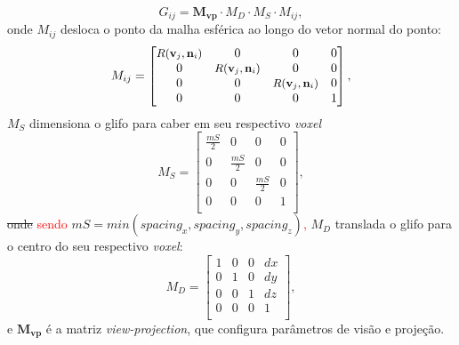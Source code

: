 \begin{equation}
    G_{ij} = \mathbf{M_{vp}}\cdot M_D \cdot M_S \cdot M_{ij},
\end{equation}
onde $M_{ij}$ desloca o ponto da malha esférica ao longo do vetor normal do ponto: 
\begin{equation}
\label{eq::dodf}
    M_{ij} = \begin{bmatrix} 
   \mbox{\small $R( \mathbf{v}_j, \mathbf{n}_i)$} & 0 & 0 & 0 \\
    0 & \mbox{\small $R( \mathbf{v}_j, \mathbf{n}_i)$}  & 0 & 0 \\
    0 & 0 & \mbox{\small $R( \mathbf{v}_j, \mathbf{n}_i)$}  & 0 \\
    0 & 0 & 0 & 1 \\
\end{bmatrix},
\end{equation}
$M_{S}$ dimensiona o glifo para caber em seu respectivo \textit{voxel}
\begin{equation}
    M_{S} = \begin{bmatrix} 
    \frac{mS}{2} & 0             & 0            & 0 \\
    0            & \frac{mS}{2} & 0            & 0 \\
    0            & 0             & \frac{mS}{2} & 0 \\
    0            & 0             & 0            & 1 \\
\end{bmatrix},
\end{equation}
\sout{onde} \textcolor{red}{sendo} $mS=min(spacing_x , spacing_y , spacing_z)$\textcolor{red}{,}
$M_{D}$ translada o glifo para o centro do seu respectivo \textit{voxel}:
\begin{equation}
\label{eq::displace}
    M_{D} = \begin{bmatrix} 
    1 & 0 & 0 & dx \\
    0 & 1 & 0 & dy \\
    0 & 0 & 1 & dz \\
    0 & 0 & 0 & 1 \\
\end{bmatrix},
\end{equation}
e $\mathbf{M_{vp}}$ é a matriz \textit{view-projection}, que configura parâmetros de visão e projeção.



